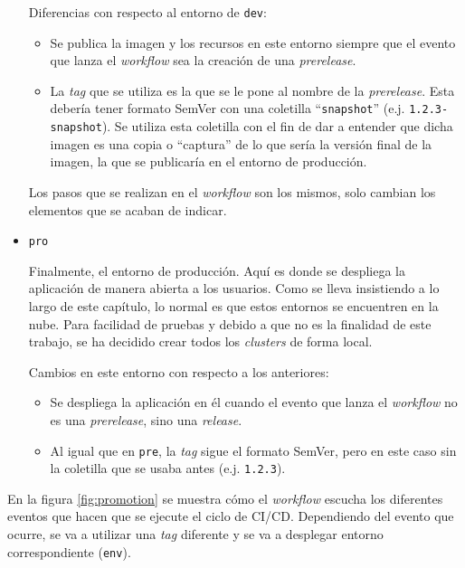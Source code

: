 \begin{itemize}
    Diferencias con respecto al entorno de \texttt{dev}:

    \begin{itemize}
      \item Se publica la imagen y los recursos en este entorno siempre que el evento que lanza el \textit{workflow} sea la creación de una \textit{prerelease}.
      \item La \textit{tag} que se utiliza es la que se le pone al nombre de la \textit{prerelease}. Esta debería tener formato SemVer\cite{semver} con una coletilla ``\texttt{snapshot}'' (e.j. \texttt{1.2.3-snapshot}). Se utiliza esta coletilla con el fin de dar a entender que dicha imagen es una copia o ``captura'' de lo que sería la versión final de la imagen, la que se publicaría en el entorno de producción.
    \end{itemize}

    Los pasos que se realizan en el \textit{workflow} son los mismos, solo cambian los elementos que se acaban de indicar.

  \item \texttt{pro}

    Finalmente, el entorno de producción. Aquí es donde se despliega la aplicación de manera abierta a los usuarios. Como se lleva insistiendo a lo largo de este capítulo, lo normal es que estos entornos se encuentren en la nube. Para facilidad de pruebas y debido a que no es la finalidad de este trabajo, se ha decidido crear todos los \textit{clusters} de forma local.

    Cambios en este entorno con respecto a los anteriores:

    \begin{itemize}
      \item Se despliega la aplicación en él cuando el evento que lanza el \textit{workflow} no es una \textit{prerelease}, sino una \textit{release}.
      \item Al igual que en \texttt{pre}, la \textit{tag} sigue el formato SemVer, pero en este caso sin la coletilla que se usaba antes (e.j. \texttt{1.2.3}).
    \end{itemize}

\end{itemize}

En la figura \ref{fig:promotion} se muestra cómo el \textit{workflow} escucha los diferentes eventos que hacen que se ejecute el ciclo de CI/CD. Dependiendo del evento que ocurre, se va a utilizar una \textit{tag} diferente y se va a desplegar entorno correspondiente (\texttt{env}).

